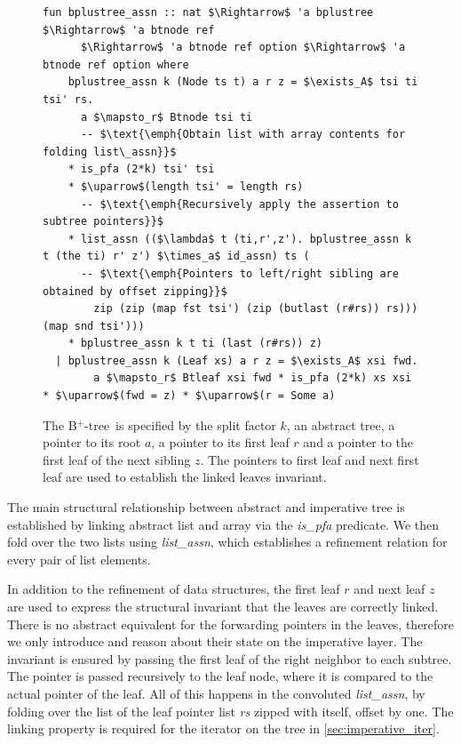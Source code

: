 \documentclass[runningheads]{llncs}
\newcommand{\btree}{B$^+$-tree}
\begin{document}
\begin{figure}
   \centering 
\begin{lstlisting}[mathescape=true, language=Isabelle,label=lst:btree-relation]
fun bplustree_assn :: nat $\Rightarrow$ 'a bplustree $\Rightarrow$ 'a btnode ref
      $\Rightarrow$ 'a btnode ref option $\Rightarrow$ 'a btnode ref option where
    bplustree_assn k (Node ts t) a r z = $\exists_A$ tsi ti tsi' rs.
      a $\mapsto_r$ Btnode tsi ti
      -- $\text{\emph{Obtain list with array contents for folding list\_assn}}$
    * is_pfa (2*k) tsi' tsi
    * $\uparrow$(length tsi' = length rs)
      -- $\text{\emph{Recursively apply the assertion to subtree pointers}}$
    * list_assn (($\lambda$ t (ti,r',z'). bplustree_assn k t (the ti) r' z') $\times_a$ id_assn) ts (
      -- $\text{\emph{Pointers to left/right sibling are obtained by offset zipping}}$
        zip (zip (map fst tsi') (zip (butlast (r#rs)) rs))) (map snd tsi')))
    * bplustree_assn k t ti (last (r#rs)) z)
  | bplustree_assn k (Leaf xs) a r z = $\exists_A$ xsi fwd. 
        a $\mapsto_r$ Btleaf xsi fwd * is_pfa (2*k) xs xsi * $\uparrow$(fwd = z) * $\uparrow$(r = Some a)
\end{lstlisting}
    \caption[Assertion describing the imperative \btree]{
        The \btree\ is specified by the split factor $k$, an abstract tree,
        a pointer to its root $a$, a pointer to its first leaf $r$ and a pointer
        to the first leaf of the next sibling $z$.
        The pointers to first leaf and next first leaf are used
        to establish the linked leaves invariant.
    }
    \label{fig:btree-assn}
\end{figure}

The main structural relationship between abstract and imperative tree
is established by linking abstract list and array via the \textit{is\_pfa} predicate.
We then fold  over the two lists using \textit{list\_assn},
which establishes a refinement relation for every pair of list elements.

In addition to the refinement of data structures,
the first leaf $r$ and next leaf $z$ are used to express the structural invariant
that the leaves are correctly linked.
There is no abstract equivalent for the forwarding pointers in the leaves,
therefore we only introduce and reason about their state on the imperative layer.
The invariant is ensured by passing the first leaf of the right neighbor to each subtree.
The pointer is passed recursively to the leaf node,
where it is compared to the actual pointer of the leaf.
All of this happens in the convoluted \textit{list\_assn}, by
folding over the list of the leaf pointer list \textit{rs} zipped with itself, offset by one.
The linking property is required for the iterator on the tree in \cref{sec:imperative_iter}.
\end{document}
